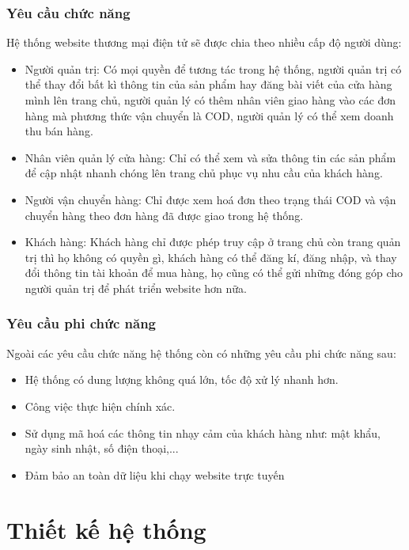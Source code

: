 \subsubsection{Yêu cầu chức năng}
 Hệ thống website thương mại điện tử sẽ được chia theo nhiều cấp độ người dùng:
\begin{itemize}
 \item Người quản trị: Có mọi quyền để tương tác trong hệ thống, người quản trị có thể thay đổi bất kì thông tin của sản phẩm hay đăng bài viết của cửa hàng mình lên trang chủ, người quản lý có thêm nhân viên giao hàng vào các đơn hàng mà phương thức vận chuyển là COD, người quản lý có thể xem doanh thu bán hàng.  
 \item Nhân viên quản lý cửa hàng: Chỉ có thể xem và sửa thông tin các sản phẩm để cập nhật nhanh chóng lên trang chủ phục vụ nhu cầu của khách hàng.
 \item Người vận chuyển hàng: Chỉ được xem hoá đơn theo trạng thái COD và vận chuyển hàng theo đơn hàng đã được giao trong hệ thống.
 \item Khách hàng: Khách hàng chỉ được phép truy cập ở trang chủ còn trang quản trị thì họ không có quyền gì, khách hàng có thể đăng kí, đăng nhập, và thay đổi thông tin tài khoản để mua hàng, họ cũng có thể gửi những đóng góp cho người quản trị để phát triển website hơn nữa.
\end{itemize}  
\subsubsection{Yêu cầu phi chức năng}
Ngoài các yêu cầu chức năng hệ thống còn có những yêu cầu phi chức năng sau:
\begin{itemize}
\item Hệ thống có dung lượng không quá lớn, tốc độ xử lý nhanh hơn.
\item Công việc thực hiện chính xác.
\item Sử dụng mã hoá các thông tin nhạy cảm của khách hàng như: mật khẩu, ngày sinh nhật, số điện thoại,...
\item Đảm bảo an toàn dữ liệu khi chạy website trực tuyến
\end{itemize}
\section{Thiết kế hệ thống}
